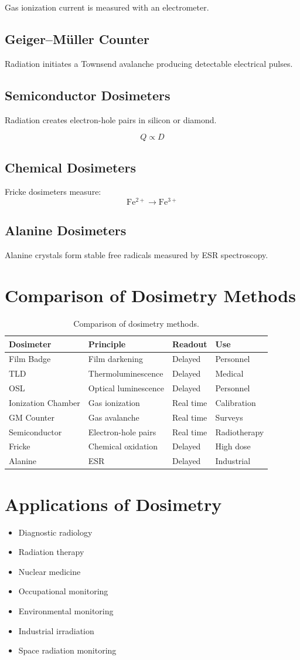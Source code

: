 \documentclass[12pt]{article}
\begin{document}
Gas ionization current is measured with an electrometer.

\subsection{Geiger--M\"uller Counter}
Radiation initiates a Townsend avalanche producing detectable electrical pulses.

\subsection{Semiconductor Dosimeters}
Radiation creates electron-hole pairs in silicon or diamond.

\[
Q\propto D
\]

\subsection{Chemical Dosimeters}
Fricke dosimeters measure:
\[
\mathrm{Fe^{2+}\rightarrow Fe^{3+}}
\]

\subsection{Alanine Dosimeters}
Alanine crystals form stable free radicals measured by ESR spectroscopy.

\section{Comparison of Dosimetry Methods}

\begin{table}[h]
\centering
\begin{tabular}{llll}
\hline
Dosimeter & Principle & Readout & Use\\ \hline
Film Badge & Film darkening & Delayed & Personnel\\
TLD & Thermoluminescence & Delayed & Medical\\
OSL & Optical luminescence & Delayed & Personnel\\
Ionization Chamber & Gas ionization & Real time & Calibration\\
GM Counter & Gas avalanche & Real time & Surveys\\
Semiconductor & Electron-hole pairs & Real time & Radiotherapy\\
Fricke & Chemical oxidation & Delayed & High dose\\
Alanine & ESR & Delayed & Industrial\\
\hline
\end{tabular}
\caption{Comparison of dosimetry methods.}
\end{table}

\section{Applications of Dosimetry}
\begin{itemize}
\item Diagnostic radiology
\item Radiation therapy
\item Nuclear medicine
\item Occupational monitoring
\item Environmental monitoring
\item Industrial irradiation
\item Space radiation monitoring
\end{itemize}  
\end{document}
